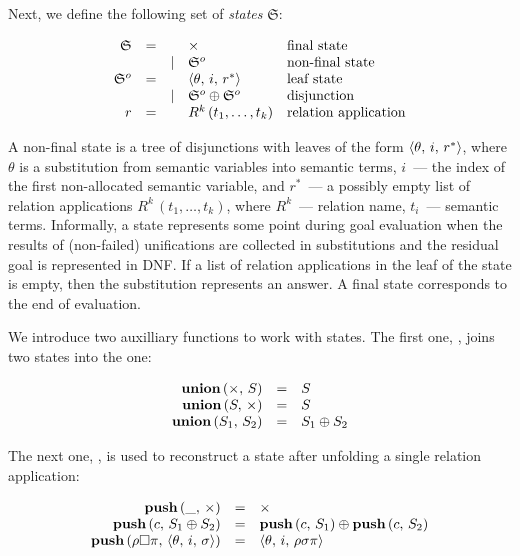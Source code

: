 Next, we define the following set of \emph{states} $\mathfrak{S}$:

\[
\begin{array}{rccll}
  \mathfrak{S} & = &      & \times         & \mbox{final state}\\
               &   & \mid & \mathfrak{S}^o & \mbox{non-final state}\\

  \mathfrak{S}^o & = &     & \langle \theta,\,i,\,r^* \rangle            & \mbox{leaf state}\\
                 &   &\mid & \mathfrak{S}^o\oplus\mathfrak{S}^o & \mbox{disjunction}\\
  
  r              & = &     & R^k\,(t_1,\dots,t_k)               & \mbox{relation application}
\end{array}
\]

A non-final state is a tree of disjunctions with leaves of the form $\langle \theta,\,i,\,r^* \rangle$, where $\theta$ is a substitution from semantic variables into semantic terms,
$i$~--- the index of the first non-allocated semantic variable, and $r^*$~--- a possibly empty list of relation applications $R^k\,(t_1,\dots,t_k)$, where $R^k$~--- relation name,
$t_i$~--- semantic terms. Informally, a state represents some point during goal evaluation when the results of (non-failed) unifications are collected in substitutions and the residual
goal is represented in DNF. If a list of relation applications in the leaf of the state is empty, then the substitution represents an answer. A final state corresponds to the end of evaluation.

We introduce two auxilliary functions to work with states. The first one, , joins two states into the one:

\[
\begin{array}{rcl}
  \mbox{\bf union}\,(\times,\, S) & = & S \\
  \mbox{\bf union}\,(S,\, \times) & = & S \\
  \mbox{\bf union}\,(S_1,\, S_2) & = & S_1\oplus S_2
\end{array}
\]

The next one, , is used to reconstruct a state after unfolding a single relation application:

\[
\begin{array}{rcl}
  \mbox{\bf push}\,(\_,\,\times) & = & \times\\
  \mbox{\bf push}\,(c,\,S_1\oplus S_2) & = & \mbox{\bf push}\,(c,\,S_1)\oplus\mbox{\bf push}\,(c,\,S_2)\\
  \mbox{\bf push}\,(\rho\Box\pi,\,\langle \theta,\,i,\,\sigma \rangle) & = & \langle \theta,\,i,\,\rho\sigma\pi \rangle
\end{array}
\]

